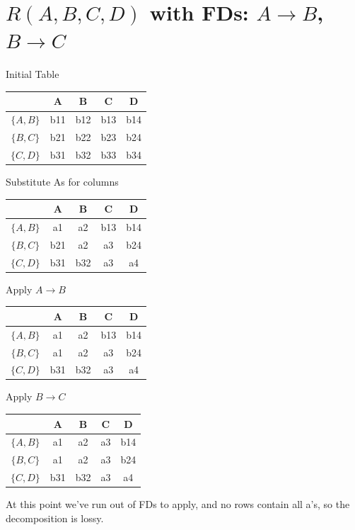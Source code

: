 \documentclass{article}
\begin{document}
\section{$R(A, B, C, D)$ with FDs: $A \rightarrow B$, $B \rightarrow C$}
\begin{table}[H]{Initial Table}
\begin{tabular}{|c|c|c|c|c|}
    \hline
    & A & B & C & D \\
    \hline
    $\{A, B\}$ & b11 & b12 & b13 & b14 \\
    \hline
    $\{B, C\}$ & b21 & b22 & b23 & b24 \\
    \hline
    $\{C, D\}$ & b31 & b32 & b33 & b34 \\
    \hline
    \end{tabular}
\end{table}

\begin{table}[H]{Substitute As for columns}
\begin{tabular}{|c|c|c|c|c|}
    \hline
    & A & B & C & D \\
    \hline
    $\{A, B\}$ & a1 & a2 & b13 & b14 \\
    \hline
    $\{B, C\}$ & b21 & a2 & a3 & b24 \\
    \hline
    $\{C, D\}$ & b31 & b32 & a3 & a4 \\
    \hline
    \end{tabular}
\end{table}

\begin{table}[H]{Apply $A \rightarrow B$}
\begin{tabular}{|c|c|c|c|c|}
    \hline
    & A & B & C & D \\
    \hline
    $\{A, B\}$ & a1 & a2 & b13 & b14 \\
    \hline
    $\{B, C\}$ & a1 & a2 & a3 & b24 \\
    \hline
    $\{C, D\}$ & b31 & b32 & a3 & a4 \\
    \hline
    \end{tabular}
\end{table}

\begin{table}[H]{Apply $B \rightarrow C$}
\begin{tabular}{|c|c|c|c|c|}
    \hline
    & A & B & C & D \\
    \hline
    $\{A, B\}$ & a1 & a2 & a3 & b14 \\
    \hline
    $\{B, C\}$ & a1 & a2 & a3 & b24 \\
    \hline
    $\{C, D\}$ & b31 & b32 & a3 & a4 \\
    \hline
    \end{tabular}
\end{table}
At this point we've run out of FDs to apply, and no rows contain all a's, so the decomposition is lossy.
\end{document}
